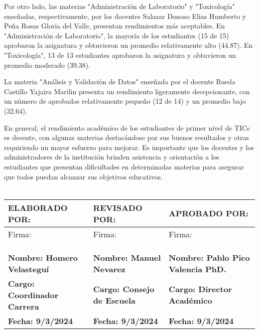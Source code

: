 Por otro lado, las materias "Administración de Laboratorio" y "Toxicología" enseñadas, respectivamente, por los docentes Salazar Donoso Elias Humberto y Peña Rosas Gloria del Valle, presentan rendimientos más aceptables. En "Administración de Laboratorio", la mayoría de los estudiantes (15 de 15) aprobaron la asignatura y obtuvieron un promedio relativamente alto (44.87). En "Toxicología", 13 de 13 estudiantes aprobaron la asignatura y obtuvieron un promedio moderado (39.38).

La materia "Análisis y Validación de Datos" enseñada por el docente Rueda Castillo Yajaira Marilin presenta un rendimiento ligeramente decepcionante, con un número de aprobados relativamente pequeño (12 de 14) y un promedio bajo (32.64).

En general, el rendimiento académico de los estudiantes de primer nivel de TICs es decente, con algunas materias destacándose por sus buenos resultados y otras requiriendo un mayor esfuerzo para mejorar. Es importante que los docentes y los administradores de la institución brinden asistencia y orientación a los estudiantes que presentan dificultades en determinadas materias para asegurar que todos puedan alcanzar sus objetivos educativos.\\
\vspace{1cm}\\\begin{tabularx}{\textwidth}{|X|X|X|}
    \hline
    \textbf{ELABORADO POR:} & \textbf{REVISADO POR:} & \textbf{APROBADO POR:} \\ \hline
    Firma: & Firma: & Firma:\\
    &&\\
    &&\\
    &&\\ \hline
    \textbf{Nombre: Homero Velasteguí} & \textbf{Nombre: Manuel Nevarez} & \textbf{Nombre: Pablo Pico Valencia PhD.} \\ \hline
    \textbf{Cargo: Coordinador Carrera} & \textbf{Cargo: Consejo de Escuela} & \textbf{Cargo: Director Académico} \\ \hline
    \textbf{Fecha: 9/3/2024} & \textbf{Fecha: 9/3/2024} & \textbf{Fecha: 9/3/2024} \\ \hline
    \end{tabularx}
